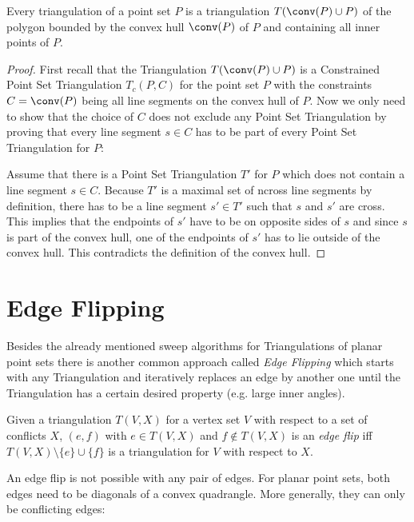 \begin{theorem}
  Every triangulation of a point set \(P\)
  is a triangulation \(T(\conv(P) \cup P)\)
  of the polygon bounded by the convex hull \(\conv(P)\) of \(P\)
  and containing all inner points of \(P\).
  \begin{proof}
  First recall that the Triangulation \(T(\conv(P) \cup P)\)
  is a Constrained Point Set Triangulation \(T_c(P,C)\) for the point
  set \(P\) with the constraints \(C = \conv(P)\) being all line
  segments on the convex hull of \(P\). Now we only need to show that
  the choice of \(C\) does not exclude any Point Set Triangulation by
  proving that every line segment \(s \in C\) has to be part of every
  Point Set Triangulation for \(P\):
  
  Assume that there is a Point Set Triangulation \(T'\) for \(P\)
  which does not contain a line segment \(s \in C\). Because \(T'\)
  is a maximal set of \gls{ncross} line segments by definition,
  there has to be a line segment \(s' \in T'\) such that \(s\) and
  \(s'\) are \gls{cross}. This implies that the endpoints of \(s'\)
  have to be on opposite sides of \(s\) and since \(s\) is part of
  the convex hull, one of the endpoints of \(s'\) has to lie outside
  of the convex hull. This contradicts the definition of the convex
  hull.
  \end{proof}
\end{theorem}

\section{Edge Flipping}
Besides the already mentioned sweep algorithms for Triangulations of
planar point sets there is another common approach called
\emph{Edge Flipping} which starts with any Triangulation and 
iteratively replaces an edge by another one until the Triangulation 
has a certain desired property (e.g. large inner angles).

\begin{definition}
  \label{def:edge_flip}
  Given a triangulation \(T(V,X)\) for a vertex set \(V\) with respect
  to a set of conflicts \(X\), \((e, f)\) with \(e \in T(V,X)\) and
  \(f \not\in T(V,X)\) is an \emph{edge flip} iff
  \(T(V,X) \setminus \{e\} \cup \{f\}\) is a triangulation for \(V\)
  with respect to \(X\).
\end{definition}

An edge flip is not possible with any pair of edges. For planar point
sets, both edges need to be diagonals of a convex quadrangle. More
generally, they can only be conflicting edges:

